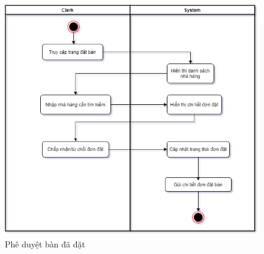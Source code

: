 \begin{figure}[!h]
    \begin{center}
        \includegraphics[scale=0.6]{Images/ActivityDiagram/pheduyetBooking_ad.jpg}
    \end{center}
    \hspace{0.3cm}
    \caption{Phê duyệt bàn đã đặt}
\end{figure}

